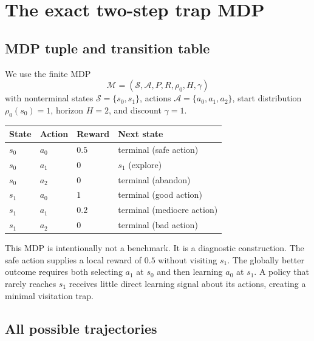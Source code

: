 \documentclass[10pt,a4paper]{article}
\begin{document}
\section{The exact two-step trap MDP}

\subsection{MDP tuple and transition table}

We use the finite MDP
\begin{equation}
\mathcal M=(\mathcal S,\mathcal A,P,R,\rho_0,H,\gamma)
\end{equation}
with nonterminal states $\mathcal S=\{s_0,s_1\}$, actions
$\mathcal A=\{a_0,a_1,a_2\}$, start distribution
$\rho_0(s_0)=1$, horizon $H=2$, and discount $\gamma=1$.

\begin{center}\small
\begin{tabular}{llll}
\toprule
State & Action & Reward & Next state\\ \midrule
$s_0$ & $a_0$ & $0.5$ & terminal (safe action)\\
$s_0$ & $a_1$ & $0$ & $s_1$ (explore)\\
$s_0$ & $a_2$ & $0$ & terminal (abandon)\\
$s_1$ & $a_0$ & $1$ & terminal (good action)\\
$s_1$ & $a_1$ & $0.2$ & terminal (mediocre action)\\
$s_1$ & $a_2$ & $0$ & terminal (bad action)\\ \bottomrule
\end{tabular}
\end{center}

This MDP is intentionally not a benchmark.  It is a diagnostic construction.
The safe action supplies a local reward of $0.5$ without visiting $s_1$.
The globally better outcome requires both selecting $a_1$ at $s_0$ and then
learning $a_0$ at $s_1$.  A policy that rarely reaches $s_1$ receives little
direct learning signal about its actions, creating a minimal visitation trap.

\subsection{All possible trajectories}
\end{document}
